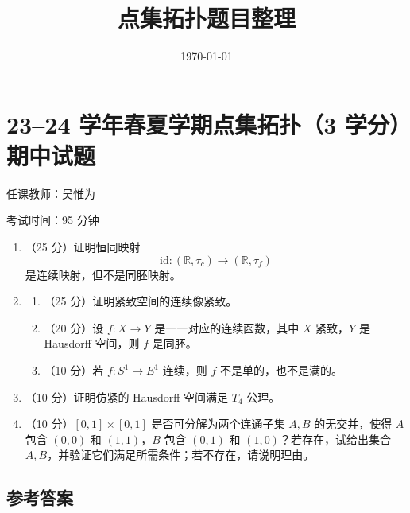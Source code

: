 \documentclass{article}
\title{点集拓扑题目整理}
\author{}
\date{\today}
\newcommand{\R}{\mathbb{R}}
\begin{document}
\maketitle
\tableofcontents

\section{23--24 学年春夏学期点集拓扑（3 学分）期中试题}

任课教师：吴惟为

考试时间：95 分钟

\begin{enumerate}
  \item （25 分）证明恒同映射
        \[
          \mathrm{id} : (\R, \tau_c) \to (\R, \tau_f)
        \]
        是连续映射，但不是同胚映射。

  \item
        \begin{enumerate}
          \item （25 分）证明紧致空间的连续像紧致。
          \item （20 分）设 $f : X \to Y$ 是一一对应的连续函数，其中 $X$ 紧致，$Y$ 是 Hausdorff 空间，则 $f$ 是同胚。
          \item （10 分）若 $f : S^1 \to E^1$ 连续，则 $f$ 不是单的，也不是满的。
        \end{enumerate}

  \item （10 分）证明仿紧的 Hausdorff 空间满足 $T_4$ 公理。

  \item （10 分）$[0,1] \times [0,1]$ 是否可分解为两个连通子集 $A,B$ 的无交并，使得 $A$ 包含 $(0,0)$ 和 $(1,1)$，$B$ 包含 $(0,1)$ 和 $(1,0)$？若存在，试给出集合 $A,B$，并验证它们满足所需条件；若不存在，请说明理由。
\end{enumerate}

\subsection*{参考答案}
\end{document}
